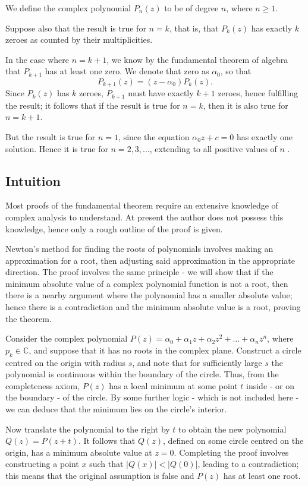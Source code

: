 \documentclass[12pt]{article}
\begin{document}
We define the complex polynomial $P_n(z)$ to be of degree $n$, where $n \ge 1$.

Suppose also that the result is true for $n = k$, that is, that $P_k(z)$ has exactly $k$ zeroes as counted by their multiplicities. \smallskip

In the case where $n = k + 1$, we know by the fundamental theorem of algebra that $P_{k + 1}$ has at least one zero. We denote that zero as $\alpha_0$, so that
\begin{equation*}
    P_{k + 1}(z) = (z - \alpha_0)P_k(z).
\end{equation*}
Since $P_k(z)$ has $k$ zeroes, $P_{k + 1}$ must have exactly $k + 1$ zeroes, hence fulfilling the result; it follows that if the result is true for $n = k$, then it is also true for $n = k + 1$. \smallskip

But the result is true for $n = 1$, since the equation $\alpha_0 z + c = 0$ has exactly one solution. Hence it is true for $n = 2, 3, \dots$, extending to all positive values of $n$ \parencite{ext2-textbook}.

\subsection*{Intuition}
Most proofs of the fundamental theorem require an extensive knowledge of complex analysis to understand. At present the author does not possess this knowledge, hence only a rough outline of the proof is given. \medskip

Newton's method for finding the roots of polynomials involves making an approximation for a root, then adjusting said approximation in the appropriate direction. The proof involves the same principle - we will show that if the minimum absolute value of a complex polynomial function is not a root, then there is a nearby argument where the polynomial has a smaller absolute value; hence there is a contradiction and the minimum absolute value is a root, proving the theorem. \smallskip

Consider the complex polynomial $P(z) = \alpha_0 + \alpha_1 z + \alpha_2 z^2 + \dots + \alpha_n z^n$, where $p_k \in \mathbb{C}$, and suppose that it has no roots in the complex plane. Construct a circle centred on the origin with radius $s$, and note that for sufficiently large $s$ the polynomial is continuous within the boundary of the circle. Thus, from the completeness axiom, $P(z)$ has a local minimum at some point $t$ inside - or on the boundary - of the circle. By some further logic - which is not included here - we can deduce that the minimum lies on the circle's interior. \smallskip

Now translate the polynomial to the right by $t$ to obtain the new polynomial $Q(z) = P(z + t)$. It follows that $Q(z)$, defined on some circle centred on the origin, has a minimum absolute value at $z = 0$. Completing the proof involves constructing a point $x$ such that $|Q(x)| < |Q(0)|$, leading to a contradiction; this means that the original assumption is false and $P(z)$ has at least one root. \parencite{mathscholar-ftoa}

\printbibliography
\end{document}

